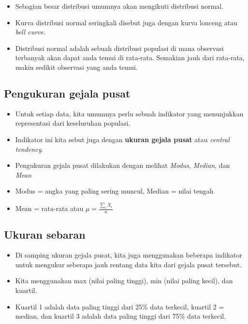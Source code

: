 \documentclass[
  letterpaper,
  DIV=11,
  numbers=noendperiod]{scrartcl}
\begin{document}
\begin{itemize}
\item
  Sebagian besar distribusi umumnya akan mengikuti distribusi normal.
\item
  Kurva distribusi normal seringkali disebut juga dengan kurva lonceng
  atau \emph{bell curve}.
\item
  Distribusi normal adalah sebuah distribusi populasi di mana observasi
  terbanyak akan dapat anda temui di rata-rata. Semakian jauh dari
  rata-rata, makin sedikit observasi yang anda temui.
\end{itemize}

\subsection{Pengukuran gejala pusat}\label{pengukuran-gejala-pusat}

\begin{itemize}
\item
  Untuk setiap data, kita umumnya perlu sebuah indikator yang
  menunjukkan representasi dari keseluruhan populasi.
\item
  Indikator ini kita sebut juga dengan \textbf{ukuran gejala pusat} atau
  \emph{central tendency}.
\item
  Pengukuran gejala pusat dilakukan dengan melihat \emph{Modus},
  \emph{Median}, dan \emph{Mean}
\item
  Modus = angka yang paling sering muncul, Median = nilai tengah
\item
  Mean = rata-rata atau \(\mu=\frac{\sum_iX_i}{n}\)
\end{itemize}

\subsection{Ukuran sebaran}\label{ukuran-sebaran}

\begin{itemize}
\item
  Di samping ukuran gejala pusat, kita juga menggunakan beberapa
  indikator untuk mengukur seberapa jauh rentang data kita dari gejala
  pusat tersebut.
\item
  Kita menggunakan max (nilai paling tinggi), min (nilai paling kecil),
  dan kuartil.
\item
  Kuartil 1 adalah data paling tinggi dari 25\% data terkecil, kuartil 2
  = median, dan kuartil 3 adalah data paling tinggi dari 75\% data
  terkecil.
\end{itemize}
\end{document}

